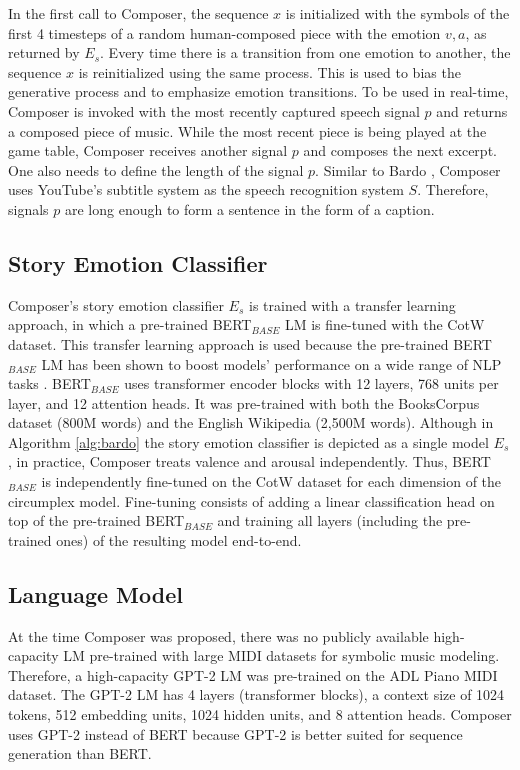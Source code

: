 In the first call to Composer, the sequence $x$ is initialized with the symbols of the first 4 timesteps of a random human-composed piece with the emotion $v, a$, as returned by $E_s$. Every time there is a transition from one emotion to another, the sequence $x$ is reinitialized using the same process. This is used to bias the generative process and to emphasize emotion transitions. To be used in real-time, Composer is invoked with the most recently captured speech signal $p$ and returns a composed piece of music. While the most recent piece is being played at the game table, Composer receives another signal $p$ and composes the next excerpt. One also needs to define the length of the signal $p$. Similar to Bardo \cite{padovani2017}, Composer uses YouTube's subtitle system as the speech recognition system $S$. Therefore, signals $p$ are long enough to form a sentence in the form of a caption.

\subsection{Story Emotion Classifier}

Composer's story emotion classifier $E_s$ is trained with a transfer learning approach, in which a pre-trained BERT$_{BASE}$ LM \cite{devlin2018bert} is fine-tuned with the CotW dataset. This transfer learning approach is used because the pre-trained BERT$_{BASE}$ LM has been shown to boost models' performance on a wide range of NLP tasks \cite{devlin2018bert}. BERT$_{BASE}$ uses transformer encoder blocks with 12 layers, 768 units per layer, and 12 attention heads. It was pre-trained with both the BooksCorpus dataset (800M words) \cite{zhu2015aligning} and the English Wikipedia (2,500M words). Although in Algorithm \ref{alg:bardo} the story emotion classifier is depicted as a single model $E_s$, in practice, Composer treats valence and arousal independently. Thus, BERT$_{BASE}$ is independently fine-tuned on the CotW dataset \cite{padovani2017} for each dimension of the circumplex model. Fine-tuning consists of adding a linear classification head on top of the pre-trained BERT$_{BASE}$ and training all layers (including the pre-trained ones) of the resulting model end-to-end.

\subsection{Language Model}

At the time Composer was proposed, there was no publicly available high-capacity LM pre-trained with large MIDI datasets for symbolic music modeling. Therefore, a high-capacity GPT-2 LM was pre-trained on the ADL Piano MIDI dataset. The GPT-2 LM has 4 layers (transformer blocks), a context size of 1024 tokens, 512 embedding units, 1024 hidden units, and 8 attention heads. Composer uses GPT-2 instead of BERT because GPT-2 is better suited for sequence generation than BERT.

